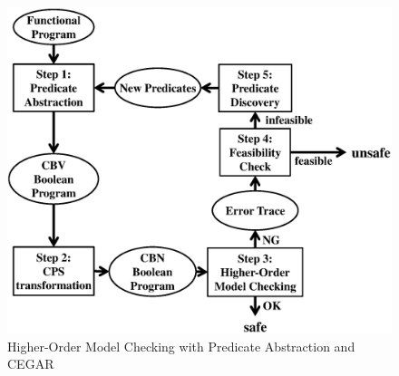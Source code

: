 \begin{figure}[tp]
 \begin{center}
  \includegraphics[scale=0.35]{overall.eps}
 \end{center}
\caption{Higher-Order Model Checking with Predicate Abstraction and CEGAR}
\label{fig:cegar}
\end{figure}


%

